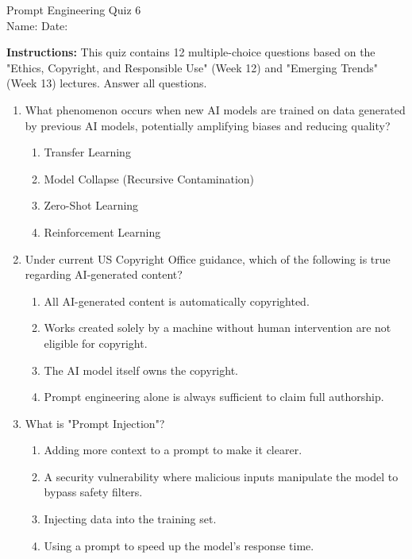 \documentclass[11pt,a4paper]{article}
\begin{document}
\begin{center}
  {\LARGE Prompt Engineering \textemdash{} Quiz 6}\\[6pt]
  {\large Name: \underline{\hspace{6cm}} \quad Date: \underline{\hspace{3cm}}}
\end{center}
\vspace{0.5cm}

\textbf{Instructions:} This quiz contains 12 multiple-choice questions based on the "Ethics, Copyright, and Responsible Use" (Week 12) and "Emerging Trends" (Week 13) lectures. Answer all questions. 
\vspace{0.5cm}

\begin{enumerate}[leftmargin=*, label=\textbf{\#\arabic*}]

  \item What phenomenon occurs when new AI models are trained on data generated by previous AI models, potentially amplifying biases and reducing quality?
    \begin{enumerate}[label=\Alph*)]
      \item Transfer Learning
      \item Model Collapse (Recursive Contamination)
      \item Zero-Shot Learning
      \item Reinforcement Learning
    \end{enumerate}

  \item Under current US Copyright Office guidance, which of the following is true regarding AI-generated content?
    \begin{enumerate}[label=\Alph*)]
      \item All AI-generated content is automatically copyrighted.
      \item Works created solely by a machine without human intervention are not eligible for copyright.
      \item The AI model itself owns the copyright.
      \item Prompt engineering alone is always sufficient to claim full authorship.
    \end{enumerate}

  \item What is "Prompt Injection"?
    \begin{enumerate}[label=\Alph*)]
      \item Adding more context to a prompt to make it clearer.
      \item A security vulnerability where malicious inputs manipulate the model to bypass safety filters.
      \item Injecting data into the training set.
      \item Using a prompt to speed up the model's response time.
    \end{enumerate}


\end{enumerate}
\end{document}
